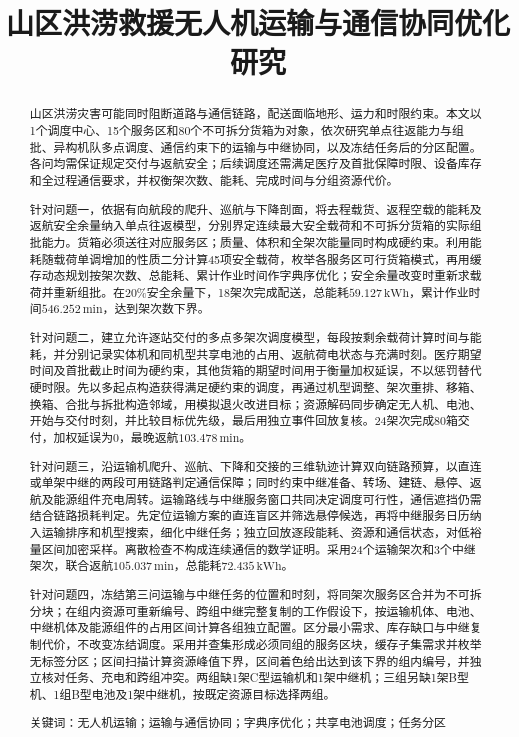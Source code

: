 \documentclass[bwprint]{gmcmthesis}
\title{山区洪涝救援无人机运输与通信协同优化研究}
\begin{document}
\maketitle

\begin{abstract}
山区洪涝灾害可能同时阻断道路与通信链路，配送面临地形、运力和时限约束。本文以1个调度中心、15个服务区和80个不可拆分货箱为对象，依次研究单点往返能力与组批、异构机队多点调度、通信约束下的运输与中继协同，以及冻结任务后的分区配置。各问均需保证规定交付与返航安全；后续调度还需满足医疗及首批保障时限、设备库存和全过程通信要求，并权衡架次数、能耗、完成时间与分组资源代价。

针对问题一，依据有向航段的爬升、巡航与下降剖面，将去程载货、返程空载的能耗及返航安全余量纳入单点往返模型，分别界定连续最大安全载荷和不可拆分货箱的实际组批能力。货箱必须送往对应服务区；质量、体积和全架次能量同时构成硬约束。利用能耗随载荷单调增加的性质二分计算45项安全载荷，枚举各服务区可行货箱模式，再用缓存动态规划按架次数、总能耗、累计作业时间作字典序优化；安全余量改变时重新求载荷并重新组批。在$20\%$安全余量下，18架次完成配送，总能耗$59.127\,\mathrm{kWh}$，累计作业时间$546.252\,\mathrm{min}$，达到架次数下界。

针对问题二，建立允许逐站交付的多点多架次调度模型，每段按剩余载荷计算时间与能耗，并分别记录实体机和同机型共享电池的占用、返航荷电状态与充满时刻。医疗期望时间及首批截止时间为硬约束，其他货箱的期望时间用于衡量加权延误，不以惩罚替代硬时限。先以多起点构造获得满足硬约束的调度，再通过机型调整、架次重排、移箱、换箱、合批与拆批构造邻域，用模拟退火改进目标；资源解码同步确定无人机、电池、开始与交付时刻，并比较目标优先级，最后用独立事件回放复核。24架次完成80箱交付，加权延误为0，最晚返航$103.478\,\mathrm{min}$。

针对问题三，沿运输机爬升、巡航、下降和交接的三维轨迹计算双向链路预算，以直连或单架中继的两段可用链路判定通信保障；同时约束中继准备、转场、建链、悬停、返航及能源组件充电周转。运输路线与中继服务窗口共同决定调度可行性，通信遮挡仍需结合链路损耗判定。先定位运输方案的直连盲区并筛选悬停候选，再将中继服务日历纳入运输排序和机型搜索，细化中继任务；独立回放逐段能耗、资源和通信状态，对低裕量区间加密采样。离散检查不构成连续通信的数学证明。采用24个运输架次和3个中继架次，联合返航$105.037\,\mathrm{min}$，总能耗$72.435\,\mathrm{kWh}$。

针对问题四，冻结第三问运输与中继任务的位置和时刻，将同架次服务区合并为不可拆分块；在组内资源可重新编号、跨组中继完整复制的工作假设下，按运输机体、电池、中继机体及能源组件的占用区间计算各组独立配置。区分最小需求、库存缺口与中继复制代价，不改变冻结调度。采用并查集形成必须同组的服务区块，缓存子集需求并枚举无标签分区；区间扫描计算资源峰值下界，区间着色给出达到该下界的组内编号，并独立核对任务、充电和跨组冲突。两组缺1架C型运输机和1架中继机；三组另缺1架B型机、1组B型电池及1架中继机，按既定资源目标选择两组。

\par\vspace{\baselineskip}
\noindent
{\lishu{} 关键词}：无人机运输；运输与通信协同；字典序优化；共享电池调度；任务分区
\end{abstract}
\end{document}
